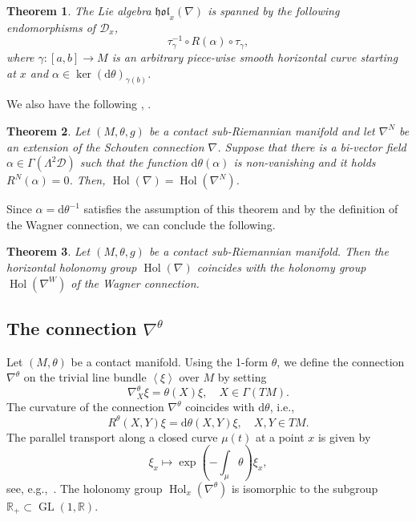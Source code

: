 \documentclass{amsart}
\theoremstyle{plain}
\newtheorem{theorem}{Theorem}[section]
\theoremstyle{definition}
\newcommand{\Hol}{\operatorname{Hol}}
\newcommand{\GL}{\operatorname{GL}}
\newcommand{\hol}{\mathfrak{hol}}
\newcommand{\Real}{\mathbb{R}}
\newcommand{\1}{\mathbf{1}}
\newcommand{\D}{{\mathcal D}}
\renewcommand{\d}{\mathrm{d}}
\newcommand{\+}{\oplus}
\begin{document}
\begin{theorem}\label{ThAS1} The Lie algebra $\hol_x(\nabla)$ is spanned by 
	the following endomorphisms of $\D_x$,
	$$\tau_\gamma^{-1}\circ R(\alpha)\circ\tau_\gamma,$$
	where $\gamma:[a,b]\to M$ is an arbitrary piece-wise smooth horizontal curve starting at $x$ and $\alpha\in\ker(\d\theta)_{\gamma(b)}$.
\end{theorem}


We also have the following \cite[Theorem~2.16]{CGJK}, \cite[Theorem~2.1]{FGR}.

\begin{theorem} Let $(M,\theta,g)$ be a contact sub-Riemannian manifold and let $\nabla^N$ be an extension of the Schouten connection $\nabla$. Suppose that there is a 
	  bi-vector field $\alpha\in\Gamma(\Lambda^2 \D)$ such that the function $\d\theta(\alpha)$ is non-vanishing and it holds $R^N(\alpha)=0$. Then, $\Hol(\nabla)=\Hol(\nabla^N)$.   \end{theorem}

Since $\alpha=\d\theta^{-1}$ satisfies the assumption of this theorem and by the definition of the Wagner connection, we can conclude the following.

\begin{theorem}\label{thholW} Let $(M,\theta,g)$ be a contact sub-Riemannian manifold. Then the horizontal holonomy group $\Hol(\nabla)$ coincides with the holonomy group $\Hol(\nabla^W)$ of the Wagner connection. 
\end{theorem}

\subsection{The connection $\nabla^\theta$}\label{secConTheta}

Let $(M,\theta)$ be a contact manifold.  
Using the 1-form $\theta$, we define the connection $\nabla^\theta$ on the trivial line bundle $\left<\xi\right>$ over $M$ by setting 
$$\nabla^\theta_X\xi=\theta(X)\xi,\quad X\in\Gamma(TM).$$
The curvature of the connection $\nabla^\theta$ coincides with $\d\theta$, i.e.,
$$R^\theta(X,Y)\xi=\d\theta(X,Y)\xi,\quad X,Y\in TM.$$
The parallel transport along a closed curve $\mu(t)$ at a point $x$ is given by
\begin{equation}
\label{parnabtheta}
\xi_x\mapsto\exp\left(-\int_\mu \theta\right)\xi_x,
\end{equation}
see, e.g.,~\cite{GalHolK}.
The holonomy group $\Hol_x(\nabla^\theta)$ is isomorphic to the subgroup $\Real_+\subset\GL(1,\Real)$. 
\end{document}
